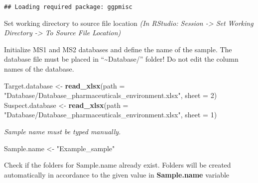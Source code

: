 \documentclass[]{article}
\newenvironment{Shaded}{\begin{snugshade}}{\end{snugshade}}
\newcommand{\KeywordTok}[1]{\textcolor[rgb]{0.13,0.29,0.53}{\textbf{#1}}}
\newcommand{\DataTypeTok}[1]{\textcolor[rgb]{0.13,0.29,0.53}{#1}}
\newcommand{\DecValTok}[1]{\textcolor[rgb]{0.00,0.00,0.81}{#1}}
\newcommand{\StringTok}[1]{\textcolor[rgb]{0.31,0.60,0.02}{#1}}
\newcommand{\CommentTok}[1]{\textcolor[rgb]{0.56,0.35,0.01}{\textit{#1}}}
\newcommand{\NormalTok}[1]{#1}
\begin{document}
\begin{verbatim}
## Loading required package: ggpmisc
\end{verbatim}

Set working directory to source file location \emph{(In RStudio: Session
-\textgreater{} Set Working Directory -\textgreater{} To Source File
Location)}

\begin{Shaded}
\end{Shaded}

Initialize MS1 and MS2 databases and define the name of the sample. The
database file must be placed in ``\textasciitilde{}Database/'' folder!
Do not edit the column names of the database.

\begin{Shaded}
\begin{Highlighting}[]
\NormalTok{Target.database <-}\StringTok{ }\KeywordTok{read_xlsx}\NormalTok{(}\DataTypeTok{path =} \StringTok{"Database/Database_pharmaceuticals_environment.xlsx"}\NormalTok{, }\DataTypeTok{sheet =} \DecValTok{2}\NormalTok{)}
\NormalTok{Suspect.database <-}\StringTok{ }\KeywordTok{read_xlsx}\NormalTok{(}\DataTypeTok{path =} \StringTok{"Database/Database_pharmaceuticals_environment.xlsx"}\NormalTok{, }\DataTypeTok{sheet =} \DecValTok{1}\NormalTok{)}
\end{Highlighting}
\end{Shaded}

\emph{Sample name must be typed manually.}

\begin{Shaded}
\begin{Highlighting}[]
\NormalTok{Sample.name <-}\StringTok{ "Example_sample"}
\end{Highlighting}
\end{Shaded}

Check if the folders for Sample.name already exist. Folders will be
created automatically in accordance to the given value in
\textbf{Sample.name} variable
\end{document}
